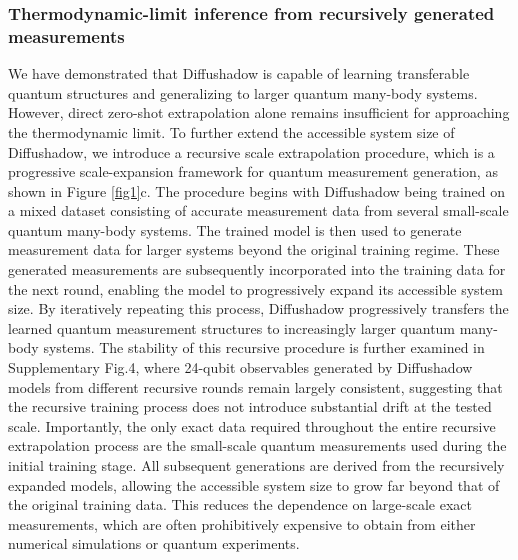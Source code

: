 \documentclass[pdflatex,sn-mathphys-num]{sn-jnl}%
\theoremstyle{thmstyleone}%
\theoremstyle{thmstyletwo}%
\theoremstyle{thmstylethree}%
\begin{document}
\subsubsection{Thermodynamic-limit inference from recursively generated measurements}


We have demonstrated that Diffushadow is capable of learning transferable quantum structures and generalizing to larger quantum many-body systems. However, direct zero-shot extrapolation alone remains insufficient for approaching the thermodynamic limit. To further extend the accessible system size of Diffushadow, we introduce a recursive scale extrapolation procedure, which is a progressive scale-expansion framework for quantum measurement generation, as shown in Figure \ref{fig1}c.
The procedure begins with Diffushadow being trained on a mixed dataset consisting of accurate measurement data from several small-scale quantum many-body systems. The trained model is then used to generate measurement data for larger systems beyond the original training regime. These generated measurements are subsequently incorporated into the training data for the next round, enabling the model to progressively expand its accessible system size. By iteratively repeating this process, Diffushadow progressively transfers the learned quantum measurement structures to increasingly larger quantum many-body systems. The stability of this recursive procedure is further examined in Supplementary Fig.4, where 24-qubit observables generated by Diffushadow models from different recursive rounds remain largely consistent, suggesting that the recursive training process does not introduce substantial drift at the tested scale.
Importantly, the only exact data required throughout the entire recursive extrapolation process are the small-scale quantum measurements used during the initial training stage. All subsequent generations are derived from the recursively expanded models, allowing the accessible system size to grow far beyond that of the original training data. This reduces the dependence on large-scale exact measurements, which are often prohibitively expensive to obtain from either numerical simulations or quantum experiments.
\end{document}

